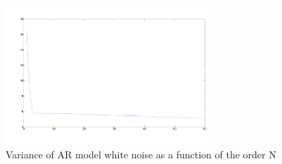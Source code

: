 \documentclass[10pt]{article}
\numberwithin{equation}{section}
\begin{document}
\begin{figure}
  \centering
  \includegraphics[width = 0.7\textwidth]{images/complete_knee}
  \caption{Variance of AR model white noise as a function of the order N}
  \label{fig:complete_knee}
\end{figure}
\end{document}
